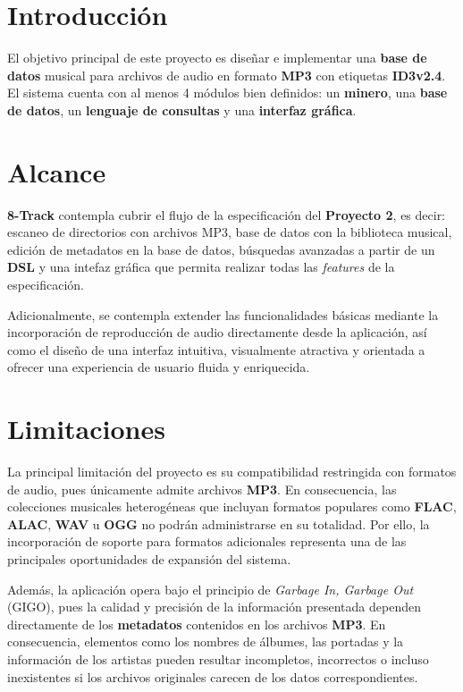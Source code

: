 \section{Introducción}

El objetivo principal de este proyecto es diseñar e implementar una \textbf{base de datos} musical
para archivos de audio en formato \textbf{MP3} con etiquetas \textbf{ID3v2.4}. El sistema cuenta con
al menos 4 módulos bien definidos: un \textbf{minero}, una \textbf{base de datos}, un \textbf{lenguaje de consultas}
y una \textbf{interfaz gráfica}.

\section*{Alcance}

\textbf{8-Track} contempla cubrir el flujo de la especificación del \textbf{Proyecto 2}, es decir:
escaneo de directorios con archivos MP3, base de datos con la biblioteca musical, edición de
metadatos en la base de datos, búsquedas avanzadas a partir de un \textbf{DSL} y una intefaz
gráfica que permita realizar todas las \textit{features} de la especificación.

Adicionalmente, se contempla extender las funcionalidades básicas mediante la incorporación de
reproducción de audio directamente desde la aplicación, así como el diseño de una interfaz intuitiva,
visualmente atractiva y orientada a ofrecer una experiencia de usuario fluida y enriquecida.

\section*{Limitaciones}

La principal limitación del proyecto es su compatibilidad restringida con formatos de audio, pues
únicamente admite archivos \textbf{MP3}. En consecuencia, las colecciones musicales heterogéneas que
incluyan formatos populares como \textbf{FLAC}, \textbf{ALAC}, \textbf{WAV} u \textbf{OGG} no podrán administrarse en su totalidad.
Por ello, la incorporación de soporte para formatos adicionales representa una de las principales
oportunidades de expansión del sistema.

Además, la aplicación opera bajo el principio de \textit{Garbage In, Garbage Out} (GIGO), pues la calidad y
precisión de la información presentada dependen directamente de los \textbf{metadatos} contenidos
en los archivos \textbf{MP3}. En consecuencia, elementos como los nombres de álbumes, las portadas y
la información de los artistas pueden resultar incompletos, incorrectos o incluso inexistentes si
los archivos originales carecen de los datos correspondientes.


